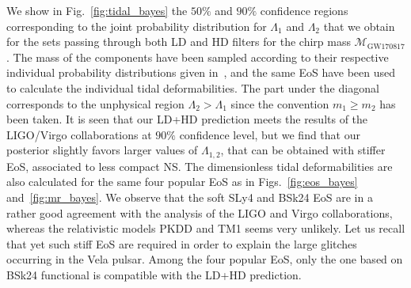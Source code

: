 We show in Fig.~\ref{fig:tidal_bayes} the $50\%$ and $90\%$ confidence
regions corresponding to the joint probability distribution for $\Lambda_1$ 
and $\Lambda_2$ that we obtain for the sets passing through both LD and HD 
filters for the chirp mass $\mathcal{M}_\text{GW170817}$. The mass of the 
components have been sampled according to their respective individual 
probability distributions given in~\cite{GWtidal}, and the same EoS have been 
used to calculate the individual tidal deformabilities. The part under
the diagonal corresponds to the unphysical region $\Lambda_2 > \Lambda_1$ since 
the convention $m_1 \geq m_2$ has been taken. It is seen that our 
LD+HD prediction meets the results of the LIGO/Virgo collaborations at 
$90\%$ confidence level, but we find that our posterior slightly favors larger 
values of $\Lambda_{1,2}$, that can be obtained with stiffer EoS, associated 
to less compact NS. 
The dimensionless tidal deformabilities are also calculated for the same four 
popular EoS as in Figs.~\ref{fig:eos_bayes} and~\ref{fig:mr_bayes}.
We observe that the soft SLy4 and BSk24 EoS are in a rather good agreement with 
the analysis of the LIGO and Virgo collaborations, whereas the relativistic
models PKDD and TM1 seems very unlikely. Let us recall that yet such stiff EoS
are required in order to explain the large glitches occurring in the Vela
pulsar. Among the four popular EoS, only the one based on BSk24 functional is
compatible with the LD+HD prediction.

